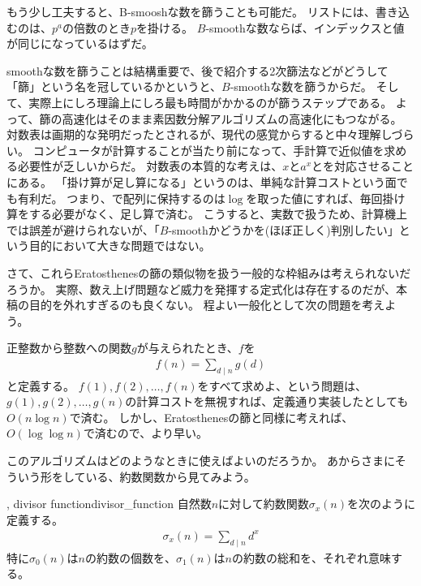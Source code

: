 もう少し工夫すると、B-smooshな数を篩うことも可能だ。
リストには、書き込むのは、$p^a$の倍数のとき$p$を掛ける。
$B$-smoothな数ならば、インデックスと値が同じになっているはずだ。


smoothな数を篩うことは結構重要で、後で紹介する2次篩法などがどうして「篩」という名を冠しているかというと、$B$-smoothな数を篩うからだ。
そして、実際上にしろ理論上にしろ最も時間がかかるのが篩うステップである。
よって、篩の高速化はそのまま素因数分解アルゴリズムの高速化にもつながる。
対数表は画期的な発明だったとされるが、現代の感覚からすると中々理解しづらい。
コンピュータが計算することが当たり前になって、手計算で近似値を求める必要性が乏しいからだ。
対数表の本質的な考えは、$x$と$a^x$とを対応させることにある。
「掛け算が足し算になる」というのは、単純な計算コストという面でも有利だ。
つまり、で配列に保持するのは$\log$を取った値にすれば、毎回掛け算をする必要がなく、足し算で済む。
こうすると、実数で扱うため、計算機上では誤差が避けられないが、「$B$-smoothかどうかを(ほぼ正しく)判別したい」という目的において大きな問題ではない。

さて、これらEratosthenesの篩の類似物を扱う一般的な枠組みは考えられないだろうか。
実際、数え上げ問題など威力を発揮する定式化は存在するのだが、本稿の目的を外れすぎるのも良くない。
程よい一般化として次の問題を考えよう。

正整数から整数への関数$g$が与えられたとき、$f$を
\begin{align*}
f(n) = \sum_{d \mid n}g(d)
\end{align*}
と定義する。
$f(1),f(2),\ldots,f(n)$をすべて求めよ、という問題は、$g(1),g(2),\ldots,g(n)$の計算コストを無視すれば、定義通り実装したとしても$O(n\log{n})$で済む。
しかし、Eratosthenesの篩と同様に考えれば、$O(\log{\log{n}})$で済むので、より早い。


このアルゴリズムはどのようなときに使えばよいのだろうか。
あからさまにそういう形をしている、約数関数から見てみよう。

\begin{Defi}{, divisor function}{divisor_function}
自然数$n$に対して約数関数$\sigma_x(n)$を次のように定義する。
\begin{align*}
\sigma_x(n) = \sum_{d \mid n} d^x
\end{align*}
特に$\sigma_0(n)$は$n$の約数の個数を、$\sigma_1(n)$は$n$の約数の総和を、それぞれ意味する。
\end{Defi}

